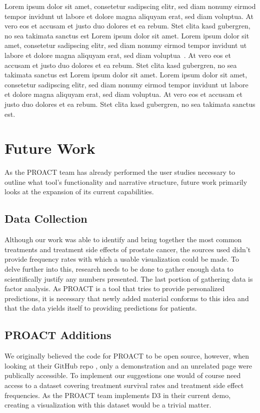 \documentclass[journal]{vgtc}                %
\begin{document}
Lorem ipsum dolor sit amet, consetetur sadipscing elitr, sed diam
nonumy eirmod tempor invidunt ut labore et dolore magna aliquyam erat,
sed diam voluptua. At vero eos et accusam et justo duo dolores et ea
rebum. Stet clita kasd gubergren, no sea takimata sanctus est Lorem
ipsum dolor sit amet. Lorem ipsum dolor sit amet, consetetur
sadipscing elitr, sed diam nonumy eirmod tempor invidunt ut labore et
dolore magna aliquyam erat, sed diam
voluptua~\cite{Kitware:2003,Max:1995:OMF}. At vero eos et accusam et
justo duo dolores et ea rebum. Stet clita kasd gubergren, no sea
takimata sanctus est Lorem ipsum dolor sit amet. Lorem ipsum dolor sit
amet, consetetur sadipscing elitr, sed diam nonumy eirmod tempor
invidunt ut labore et dolore magna aliquyam erat, sed diam
voluptua. At vero eos et accusam et justo duo dolores et ea
rebum. Stet clita kasd gubergren, no sea takimata sanctus est.

\section{Future Work}
        As the PROACT team has already performed the user studies necessary to outline what tool's functionality and narrative structure, future work primarily looks at the expansion of its current capabilities.

        \subsection{Data Collection}
                Although our work was able to identify and bring together the most common treatments and treatment side effects of prostate cancer, the sources used didn't provide frequency rates with which a usable visualization could be made.
                To delve further into this, research needs to be done to gather enough data to scientifically justify any numbers presented.
                The last portion of gathering data is factor analysis.
                As PROACT is a tool that tries to provide personalized predictions, it is necessary that newly added material conforms to this idea and that the data yields itself to providing predictions for patients.

        \subsection{PROACT Additions}
                We originally believed the code for PROACT to be open source, however, when looking at their GitHub repo \cite{PROACTDemo:2016}, only a demonstration and an unrelated page were publically accessible.
                To implement our suggestions one would of course need access to a dataset covering treatment survival rates and treatment side effect frequencies.
                As the PROACT team implements D3 in their current demo, creating a visualization with this dataset would be a trivial matter.
\end{document}
